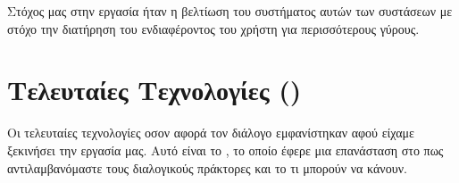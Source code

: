 Στόχος μας στην εργασία ήταν η βελτίωση του συστήματος αυτών των συστάσεων με στόχο την διατήρηση του ενδιαφέροντος του χρήστη για περισσότερους γύρους.

\section{Τελευταίες Τεχνολογίες ()}

Οι τελευταίες τεχνολογίες οσον αφορά τον διάλογο εμφανίστηκαν αφού είχαμε ξεκινήσει την εργασία μας. Αυτό είναι το , το οποίο έφερε μια επανάσταση στο πως αντιλαμβανόμαστε τους διαλογικούς πράκτορες και το τι μπορούν να κάνουν.
